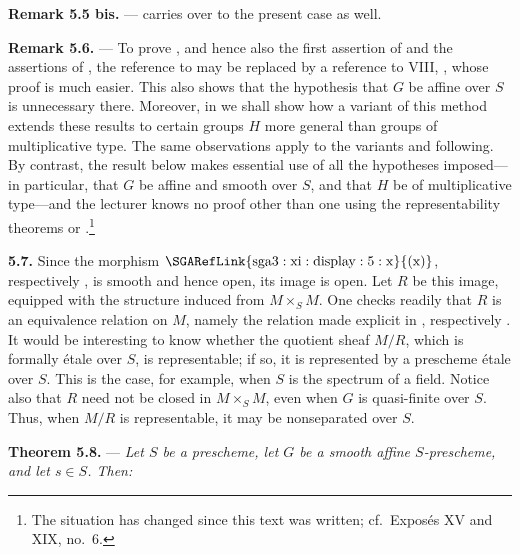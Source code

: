 \medskip
\noindent{}\textbf{Remark 5.5 bis.} ---
 carries over to the present case as well.

\medskip
\noindent{}\textbf{Remark 5.6.} ---
To prove , and hence also the first assertion of  and the
assertions of , the reference to  may be replaced by a
reference to VIII, , whose proof is much easier.  This also shows
that the hypothesis that \(G\) be affine over \(S\) is unnecessary
there.  Moreover, in  we shall show how a variant of this
method extends these results to certain groups \(H\) more general
than groups of multiplicative type.  The same observations apply to
the variants  and following.  By contrast, the result 
below makes essential use of all the hypotheses imposed---in
particular, that \(G\) be affine and smooth over \(S\), and that
\(H\) be of multiplicative type---and the lecturer knows no proof
other than one using the representability theorems  or
.\footnote{The situation has changed since this text was written;
cf.\ Exposés XV and XIX, no.~6.}

\medskip
\noindent{}\textbf{5.7.}
Since the morphism \(\mathrm{\SGARefLink{sga3:xi:display:5:x}{(x)}}\), respectively
, is smooth and hence open, its image is open.
Let \(R\) be this image, equipped with the structure induced from
\(M\times_S M\).  One checks readily that \(R\) is an equivalence
relation on \(M\), namely the relation made explicit in ,
respectively .  It would be interesting to know whether the
quotient sheaf \(M/R\), which is formally étale over \(S\), is
representable; if so, it is represented by a prescheme étale over
\(S\).  This is the case, for example, when \(S\) is the spectrum of
a field.  Notice also that \(R\) need not be closed in
\(M\times_S M\), even when \(G\) is quasi-finite over \(S\).  Thus,
when \(M/R\) is representable, it may be nonseparated over \(S\).

\medskip
\noindent{}\textbf{Theorem 5.8.} ---
\textit{Let \(S\) be a prescheme, let \(G\) be a smooth affine
\(S\)-prescheme, and let \(s\in S\).  Then:}

